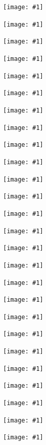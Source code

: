 \documentclass[a4paper]{article}
\newcommand*{\includeFullPage}[1]{ %
    \newpage%
    \vspace*{-2.5cm}%
    \hspace*{-0.16\textwidth}%
    \texttt{[image: \#1]}%
}
\begin{document}
    \centering

    \newpage
    \recalctypearea

    \includeFullPage{current.pdf}

    \includeFullPage{solution_rel.pdf}

        \includeFullPage{Overview/IP_solution_rel.pdf}

        \includeFullPage{Overview/DW_solution_rel.pdf}

        \includeFullPage{Overview/CSA_solution_rel.pdf}

        \includeFullPage{Overview/GAS_solution_rel.pdf}

        \includeFullPage{Overview/TA_solution_rel.pdf}

        \includeFullPage{Overview/PSE_solution_rel.pdf}

        \includeFullPage{Overview/CALC_solution_rel.pdf}

        \includeFullPage{Overview/CG_solution_rel.pdf}

        \includeFullPage{Overview/GP_solution_rel.pdf}

        \includeFullPage{Overview/MB_solution_rel.pdf}

        \includeFullPage{Overview/IDBS_solution_rel.pdf}

        \includeFullPage{Overview/LA_solution_rel.pdf}

        \includeFullPage{Overview/DS_solution_rel.pdf}

        \includeFullPage{Overview/PPD_solution_rel.pdf}

        \includeFullPage{Overview/CN_solution_rel.pdf}

        \includeFullPage{Overview/FYS_solution_rel.pdf}

        \includeFullPage{Overview/NA_solution_rel.pdf}

        \includeFullPage{Overview/ES_solution_rel.pdf}

        \includeFullPage{Overview/US_solution_rel.pdf}

        \includeFullPage{Overview/SE_solution_rel.pdf}

        \includeFullPage{Overview/TCS_solution_rel.pdf}

        \includeFullPage{Overview/AI_solution_rel.pdf}

        \includeFullPage{Overview/AC_solution_rel.pdf}

        \includeFullPage{Overview/DSGA_solution_rel.pdf}
\end{document}
